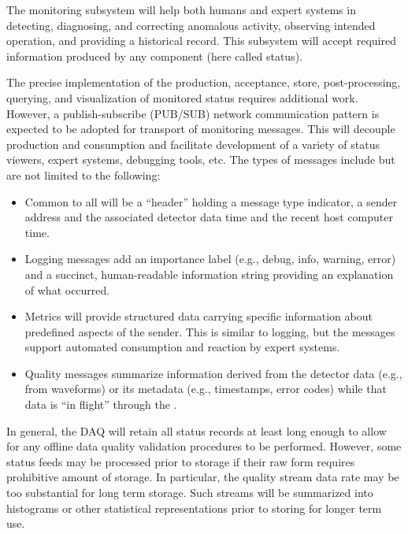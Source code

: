 The  monitoring subsystem will help both humans and expert systems in
detecting, diagnosing, and correcting anomalous activity, observing intended
operation, and providing a historical record.
This subsystem will accept required information produced by any 
component (here called status).

The precise implementation of the production, acceptance, store,
post-processing, querying, and visualization of monitored status requires
additional work. 
However, a publish-subscribe (PUB/SUB) network communication pattern is expected
to be adopted for transport of monitoring messages. 
This will decouple production and consumption and facilitate development of a
variety of status viewers, expert systems, debugging tools, etc. 
The types of messages include but are not limited to the following:

\begin{itemize}
\item Common to all will be a ``header'' holding a message type indicator, a
  sender address and the associated detector data time and the recent host
  computer time.
 
\item Logging messages add an importance label (e.g., debug, info, warning,
  error) and a succinct, human-readable information string providing an
  explanation of what occurred.
  
\item Metrics will provide structured data carrying specific information about
  predefined aspects of the sender. 
  This is similar to logging, but the messages support automated consumption and
  reaction by expert systems.  

\item Quality messages summarize information derived from the detector data
  (e.g., from waveforms) or its metadata (e.g., timestamps, error codes) while
  that data is ``in flight'' through the .

\end{itemize}

In general, the DAQ will retain all status records at least long enough to allow
for any offline data quality validation procedures to be performed. 
However, some status feeds may be processed prior to storage if their raw form
requires prohibitive amount of storage. 
In particular, the quality stream data rate may be too substantial for long term
storage. 
Such streams will be summarized into histograms or other statistical
representations prior to storing for longer term use.

